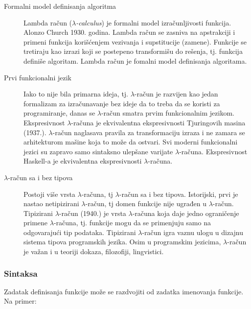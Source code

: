 \documentclass[../main.tex]{subfiles}
\begin{document}
	   \begin{description}
	   
	   \item[Formalni model definisanja algoritma] \hfill
	   
	   Lambda račun ($\lambda${\it -calculus}) je formalni model izračunljivosti funkcija. Alonzo Church 1930. godina. Lambda račun se zasniva na apstrakciji i primeni funkcija korišćenjem vezivanja i supstitucije (zamene). Funkcije se tretiraju kao izrazi koji se postepeno transformišu do rešenja, tj. funkcija definiše algoritam. Lambda račun je fomalni model definisanja algoritama.
	   
	   \item[Prvi funkcionalni jezik] \hfill
	   
	   Iako to nije bila primarna ideja, tj. $\lambda$-račun je razvijen kao jedan formalizam za izračunavanje bez ideje da to treba da se koristi za programiranje, danas se $\lambda$-račun smatra prvim funkcionalnim jezikom. Ekspresivnost $\lambda$-računa je ekvivalentna ekspresivnosti Tjuringovih masina (1937.). $\lambda$-račun naglasava pravila za transformaciju izraza i ne zamara se arhitekturom mašine koja to može da ostvari. Svi moderni funkcionalni jezici su zapravo samo sintaksno ulepšane varijate $\lambda$-računa. Ekspresivnost Haskell-a je ekvivalentna ekspresivnosti $\lambda$-računa.
	   
	   \item[$\lambda$-račun sa i bez tipova] \hfill
	   
	   Postoji više vrsta $\lambda$-računa, tj $\lambda$-račun sa i bez tipova. Istorijski, prvi je nastao netipizirani $\lambda$-račun, tj domen funkcije nije ugrađen u $\lambda$-račun. Tipizirani $\lambda$-račun (1940.) je vrsta $\lambda$-računa koja daje jedno ograničenje primene $\lambda$-računa, tj. funkcije mogu da se primenjuju samo na odgovarajući tip podataka. Tipizirani $\lambda$-račun igra vaznu ulogu u dizajnu sistema tipova programskih jezika. Osim u programskim jezicima, $\lambda$-račun je važan i u teoriji dokaza, filozofiji, lingvistici.
	   
	   \end{description}
	   
	   \subsubsection{Sintaksa} 								%
	   
	   Zadatak definisanja funkcije može se razdvojiti od zadatka imenovanja funkcije. Na primer:
	   
\end{document}
